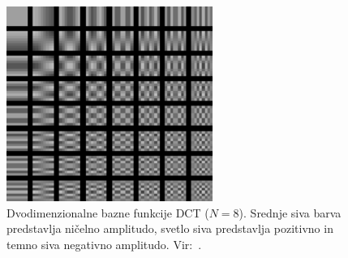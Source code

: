 \documentclass[a4paper,12pt,openright]{book}
\begin{document}
\begin{figure}[ht] %
\begin{center}
\includegraphics[width=0.6\textwidth]{slike/bazne_funkcije_2D.pdf}
\end{center}
\caption{Dvodimenzionalne bazne funkcije DCT ($N=8$). Srednje siva barva predstavlja ničelno amplitudo, svetlo siva predstavlja pozitivno in temno siva negativno amplitudo. Vir:~\cite{matlab_slika}.}
\label{2D_bazne_funkcije}
\end{figure}
\end{document}
